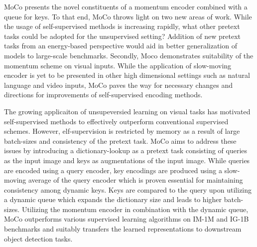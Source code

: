 \documentclass[10pt,letterpaper]{article}
\begin{document}
MoCo presents the novel constituents of a momentum encoder combined with a queue for keys. To that end, MoCo throws light on two new areas of work. While the usage of self-supervised methods is increasing rapidly, what other pretext tasks could be adopted for the unsupervised setting? Addition of new pretext tasks from an energy-based perspective would aid in better generalization of models to large-scale benchmarks. Secondly, Moco demonstrates suitability of the momentum scheme on visual inputs. While the application of slow-moving encoder is yet to be presented in other high dimensional settings such as natural language and video inputs, MoCo paves the way for necessary changes and directions for improvements of self-supervised encoding methods.

The growing applicaiton of unsupeversied learning on visual tasks has motivated self-supervised methods to effectively outperform conventional supervised schemes. However, elf-supervision is restricted by memory as a result of large batch-sizes and consistency of the pretext task. MoCo aims to address these issues by introducing a dictionary-lookup as a pretext task consisting of queries as the input image and keys as augmentations of the input image. While queries are encoded using a query encoder, key encodings are produced using a slow-moving average of the query encoder which is proven essential for maintaining consistency among dynamic keys. Keys are compared to the query upon utilizing a dynamic queue which expands the dictionary size and leads to higher batch-sizes. Utilizing the momentum encoder in combination with the dynamic queue, MoCo outperforms various supervised learning algorithms on IM-1M and IG-1B benchmarks and suitably transfers the learned representations to downstream object detection tasks.
\end{document}
